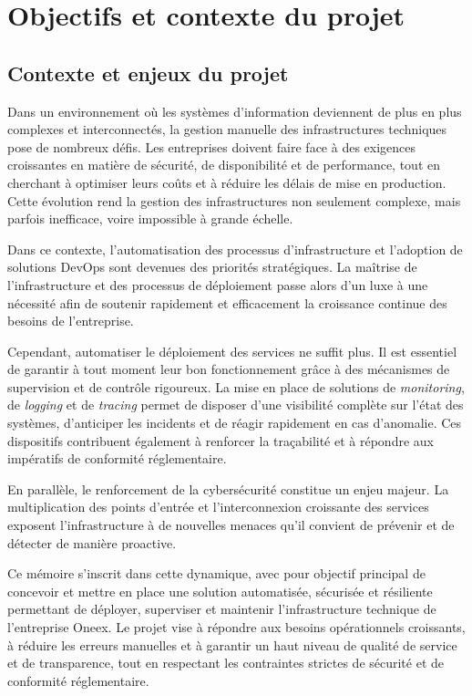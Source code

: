 \thispagestyle{mainmatter}

\section{Objectifs et contexte du projet}
\subsection{Contexte et enjeux du projet}

Dans un environnement où les systèmes d'information deviennent de plus en plus complexes et interconnectés, la gestion manuelle des infrastructures techniques pose de nombreux défis. Les entreprises doivent faire face à des exigences croissantes en matière de sécurité, de disponibilité et de performance, tout en cherchant à optimiser leurs coûts et à réduire les délais de mise en production. Cette évolution rend la gestion des infrastructures non seulement complexe, mais parfois inefficace, voire impossible à grande échelle.

Dans ce contexte, l'automatisation des processus d'infrastructure et l'adoption de solutions DevOps sont devenues des priorités stratégiques. La maîtrise de l'infrastructure et des processus de déploiement passe alors d'un luxe à une nécessité afin de soutenir rapidement et efficacement la croissance continue des besoins de l'entreprise.

Cependant, automatiser le déploiement des services ne suffit plus. Il est essentiel de garantir à tout moment leur bon fonctionnement grâce à des mécanismes de supervision et de contrôle rigoureux. La mise en place de solutions de \emph{monitoring}, de \emph{logging} et de \emph{tracing} permet de disposer d'une visibilité complète sur l'état des systèmes, d'anticiper les incidents et de réagir rapidement en cas d'anomalie. Ces dispositifs contribuent également à renforcer la traçabilité et à répondre aux impératifs de conformité réglementaire.

En parallèle, le renforcement de la cybersécurité constitue un enjeu majeur. La multiplication des points d'entrée et l'interconnexion croissante des services exposent l'infrastructure à de nouvelles menaces qu'il convient de prévenir et de détecter de manière proactive.

Ce mémoire s'inscrit dans cette dynamique, avec pour objectif principal de concevoir et mettre en place une solution automatisée, sécurisée et résiliente permettant de déployer, superviser et maintenir l'infrastructure technique de l'entreprise Oneex. Le projet vise à répondre aux besoins opérationnels croissants, à réduire les erreurs manuelles et à garantir un haut niveau de qualité de service et de transparence, tout en respectant les contraintes strictes de sécurité et de conformité réglementaire.

